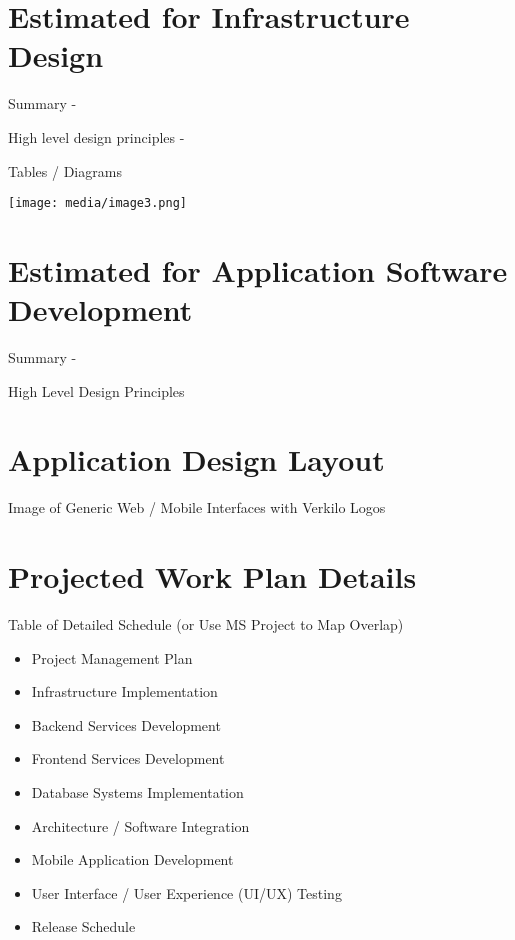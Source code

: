 \documentclass[10pt,openany]{book}
\providecommand{\tightlist}{%
  \setlength{\itemsep}{0pt}\setlength{\parskip}{0pt}}
\begin{document}
\hypertarget{estimated-for-infrastructure-design}{%
\section{Estimated for Infrastructure
Design}\label{estimated-for-infrastructure-design}}

Summary -

High level design principles -

Tables / Diagrams

\texttt{[image: media/image3.png]}

\hypertarget{estimated-for-application-software-development}{%
\section{Estimated for Application Software
Development}\label{estimated-for-application-software-development}}

Summary -

High Level Design Principles

\hypertarget{application-design-layout}{%
\section{Application Design Layout}\label{application-design-layout}}

Image of Generic Web / Mobile Interfaces with Verkilo Logos

\hypertarget{projected-work-plan-details}{%
\section{Projected Work Plan
Details}\label{projected-work-plan-details}}

Table of Detailed Schedule (or Use MS Project to Map Overlap)

\begin{itemize}
\tightlist
\item
  Project Management Plan
\item
  Infrastructure Implementation
\item
  Backend Services Development
\item
  Frontend Services Development
\item
  Database Systems Implementation
\item
  Architecture / Software Integration
\item
  Mobile Application Development
\item
  User Interface / User Experience (UI/UX) Testing
\item
  Release Schedule
\end{itemize}
\end{document}
